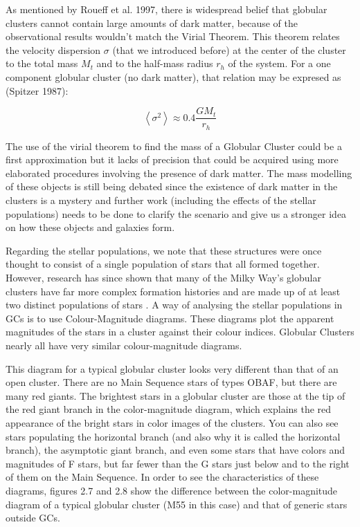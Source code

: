 As mentioned by Roueff et al. 1997, there is  widespread belief that globular clusters cannot contain large amounts of dark matter, because of the observational results wouldn't match the  Virial Theorem. This theorem relates the velocity dispersion $ \sigma $ (that we introduced before) at the center of the cluster to the total mass $M_{t}$ and to the half-mass radius $r_{h}$ of the system. For a one component globular cluster (no dark matter), that relation may be expresed as (Spitzer 1987):

\begin{equation}
\left\langle \sigma^{2}\right\rangle \approx0.4\frac{GM_{t}}{r_{h}}
\end{equation}

The use of the virial theorem to find the mass of a Globular Cluster could be a first approximation but it lacks of precision that could be acquired using more elaborated procedures involving the presence of dark matter. The mass modelling of these objects is still being debated since the existence of dark matter in the clusters is a mystery and further work (including the effects of the stellar populations) needs to be done to clarify the scenario and give us a stronger idea on how these objects and galaxies form. 

Regarding the stellar populations, we note that these structures were once thought to consist of a single population of stars that all formed together. However, research has since shown that many of the Milky Way's globular clusters have far more complex formation histories and are made up of at least two distinct populations of stars \cite{15}. A way of analysing the stellar populations in GCs is to use Colour-Magnitude diagrams. These diagrams plot the apparent magnitudes of the stars in a cluster against their colour indices. Globular Clusters nearly all have very similar colour-magnitude diagrams.

This diagram for a typical globular cluster looks very different than that of an open cluster. There are no Main Sequence stars of types OBAF, but there are many red giants. The brightest stars in a globular cluster are those at the tip of the red giant branch in the color-magnitude diagram, which explains the red appearance of the bright stars in color images of the clusters. You can also see stars populating the horizontal branch (and also why it is called the horizontal branch), the asymptotic giant branch, and even some stars that have colors and magnitudes of F stars, but far fewer than the G stars just below and to the right of them on the Main Sequence. In order to see the characteristics of these diagrams, figures 2.7 and 2.8 show the difference between the color-magnitude diagram of a typical globular cluster (M55 in this case) and that of generic stars outside GCs.

